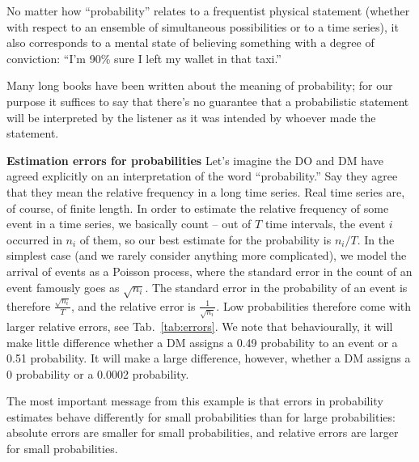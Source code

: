 \documentclass[11pt]{article}
\newcommand{\tref}[1]{Tab.~\ref{tab:#1}}
\newcommand{\subhead}[1]{\mbox{}\newline\textbf{#1}\newline}
\numberwithin{equation}{section}
\begin{document}
No matter how ``probability'' relates to a frequentist physical statement (whether with respect to an ensemble of simultaneous possibilities or to a time series), it also corresponds to a mental state of believing something with a degree of conviction: ``I'm 90\% sure I left my wallet in that taxi.''

Many long books have been written about the meaning of probability; for our purpose it suffices to say that there's no guarantee that a probabilistic statement will be interpreted by the listener as it was intended by whoever made the statement.

\subhead{Estimation errors for probabilities}
Let's imagine the DO and DM have agreed explicitly on an interpretation of the word ``probability.'' Say they agree that they mean the relative frequency in a long time series. Real time series are, of course, of finite length. In order to estimate the relative frequency of some event in a time series, we basically count -- out of $T$ time intervals, the event $i$ occurred in $n_i$ of them, so our best estimate for the probability is $n_i/T$. In the simplest case (and we rarely consider anything more complicated), we model the arrival of events as a Poisson process, where the standard error in the count of an event famously goes as $\sqrt{n_i}$. The standard error in the probability of an event is therefore $\frac{\sqrt{n_i}}{T}$, and the relative error is $\frac{1}{\sqrt{n_i}}$. Low probabilities therefore come with larger relative errors, see \tref{errors}. We note that behaviourally, it will make little difference whether a DM assigns a 0.49 probability to an event or a 0.51 probability. It will make a large difference, however, whether a DM assigns a 0 probability or a 0.0002 probability.

The most important message from this example is that errors in probability estimates behave differently for small probabilities than for large probabilities: absolute errors are smaller for small probabilities, and relative errors are larger for small probabilities.
\end{document}
